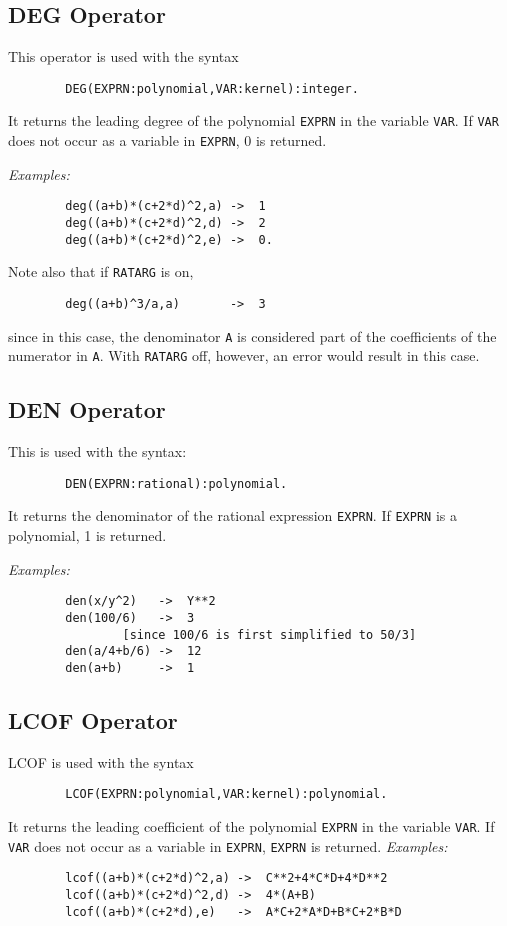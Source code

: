 \subsection{DEG Operator}

This operator is used with the syntax
\begin{verbatim}
        DEG(EXPRN:polynomial,VAR:kernel):integer.
\end{verbatim}
It returns the leading degree of the polynomial {\tt EXPRN}
in the variable {\tt VAR}.  If {\tt VAR} does not occur as a variable in
{\tt EXPRN}, 0 is returned.

{\it Examples:}
\begin{verbatim}
        deg((a+b)*(c+2*d)^2,a) ->  1
        deg((a+b)*(c+2*d)^2,d) ->  2
        deg((a+b)*(c+2*d)^2,e) ->  0.
\end{verbatim}
Note also that if {\tt RATARG} is on,
\begin{verbatim}
        deg((a+b)^3/a,a)       ->  3
\end{verbatim}
since in this case, the denominator {\tt A} is considered part of the
coefficients of the numerator in {\tt A}.  With {\tt RATARG} off, however,
an error would result in this case.

\subsection{DEN Operator}

This is used with the syntax:
\begin{verbatim}
        DEN(EXPRN:rational):polynomial.
\end{verbatim}
It returns the denominator of the rational expression {\tt EXPRN}.  If
{\tt EXPRN} is a polynomial, 1 is returned.

{\it Examples:}
\begin{verbatim}
        den(x/y^2)   ->  Y**2
        den(100/6)   ->  3
                [since 100/6 is first simplified to 50/3]
        den(a/4+b/6) ->  12
        den(a+b)     ->  1
\end{verbatim}

\subsection{LCOF Operator}

LCOF is used with the syntax
\begin{verbatim}
        LCOF(EXPRN:polynomial,VAR:kernel):polynomial.
\end{verbatim}
It returns the leading coefficient of the
polynomial {\tt EXPRN} in the variable {\tt VAR}.  If {\tt VAR} does not
occur as a variable in {\tt EXPRN}, {\tt EXPRN} is returned.
\extendedmanual{\newpage}
{\it Examples:}
\begin{verbatim}
        lcof((a+b)*(c+2*d)^2,a) ->  C**2+4*C*D+4*D**2
        lcof((a+b)*(c+2*d)^2,d) ->  4*(A+B)
        lcof((a+b)*(c+2*d),e)   ->  A*C+2*A*D+B*C+2*B*D
\end{verbatim}

